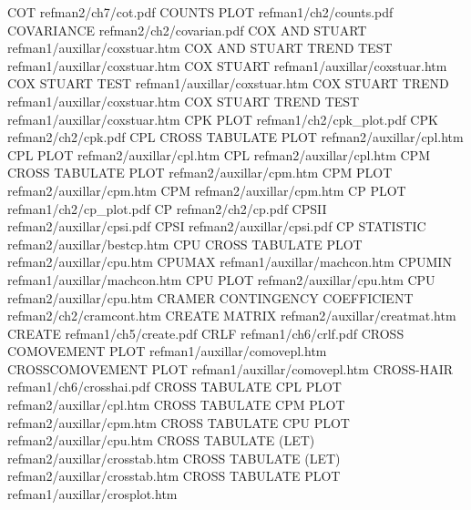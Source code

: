 COT                                     refman2/ch7/cot.pdf
COUNTS PLOT                             refman1/ch2/counts.pdf
COVARIANCE                              refman2/ch2/covarian.pdf
COX AND STUART                          refman1/auxillar/coxstuar.htm
COX AND STUART TREND TEST               refman1/auxillar/coxstuar.htm
COX STUART                              refman1/auxillar/coxstuar.htm
COX STUART TEST                         refman1/auxillar/coxstuar.htm
COX STUART TREND                        refman1/auxillar/coxstuar.htm
COX STUART TREND TEST                   refman1/auxillar/coxstuar.htm
CPK PLOT                                refman1/ch2/cpk_plot.pdf
CPK                                     refman2/ch2/cpk.pdf
CPL CROSS TABULATE PLOT                 refman2/auxillar/cpl.htm
CPL PLOT                                refman2/auxillar/cpl.htm
CPL                                     refman2/auxillar/cpl.htm
CPM CROSS TABULATE PLOT                 refman2/auxillar/cpm.htm
CPM PLOT                                refman2/auxillar/cpm.htm
CPM                                     refman2/auxillar/cpm.htm
CP PLOT                                 refman1/ch2/cp_plot.pdf
CP                                      refman2/ch2/cp.pdf
CPSII                                   refman2/auxillar/cpsi.pdf
CPSI                                    refman2/auxillar/cpsi.pdf
CP STATISTIC                            refman2/auxillar/bestcp.htm
CPU CROSS TABULATE PLOT                 refman2/auxillar/cpu.htm
CPUMAX                                  refman1/auxillar/machcon.htm
CPUMIN                                  refman1/auxillar/machcon.htm
CPU PLOT                                refman2/auxillar/cpu.htm
CPU                                     refman2/auxillar/cpu.htm
CRAMER CONTINGENCY COEFFICIENT          refman2/ch2/cramcont.htm
CREATE MATRIX                           refman2/auxillar/creatmat.htm
CREATE                                  refman1/ch5/create.pdf
CRLF                                    refman1/ch6/crlf.pdf
CROSS COMOVEMENT PLOT                   refman1/auxillar/comovepl.htm
CROSSCOMOVEMENT PLOT                    refman1/auxillar/comovepl.htm
CROSS-HAIR                              refman1/ch6/crosshai.pdf
CROSS TABULATE CPL PLOT                 refman2/auxillar/cpl.htm
CROSS TABULATE CPM PLOT                 refman2/auxillar/cpm.htm
CROSS TABULATE CPU PLOT                 refman2/auxillar/cpu.htm
CROSS TABULATE (LET)                    refman2/auxillar/crosstab.htm
CROSS TABULATE (LET)                    refman2/auxillar/crosstab.htm
CROSS TABULATE PLOT                     refman1/auxillar/crosplot.htm
